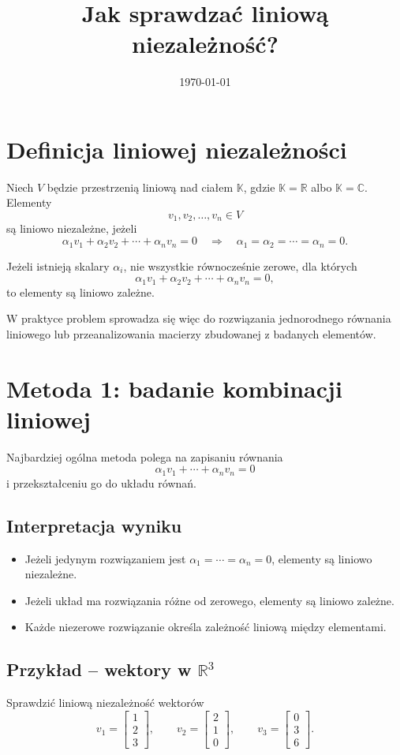 \documentclass{article}
\title{Jak sprawdzać liniową niezależność?}
\date{\today}
\begin{document}
\maketitle

\section{Definicja liniowej niezależności}

Niech $V$ będzie przestrzenią liniową nad ciałem $\mathbb K$, gdzie $\mathbb K=\mathbb R$ albo $\mathbb K=\mathbb C$. Elementy
\[
v_1,v_2,\ldots,v_n\in V
\]
są liniowo niezależne, jeżeli
\[
\alpha_1v_1+\alpha_2v_2+\cdots+\alpha_nv_n=0
\quad\Longrightarrow\quad
\alpha_1=\alpha_2=\cdots=\alpha_n=0.
\]

Jeżeli istnieją skalary $\alpha_i$, nie wszystkie równocześnie zerowe, dla których
\[
\alpha_1v_1+\alpha_2v_2+\cdots+\alpha_nv_n=0,
\]
to elementy są liniowo zależne.

W praktyce problem sprowadza się więc do rozwiązania jednorodnego równania liniowego lub przeanalizowania macierzy zbudowanej z badanych elementów.

\section{Metoda 1: badanie kombinacji liniowej}

Najbardziej ogólna metoda polega na zapisaniu równania
\[
\alpha_1v_1+\cdots+\alpha_nv_n=0
\]
i przekształceniu go do układu równań.

\subsection{Interpretacja wyniku}
\begin{itemize}
    \item Jeżeli jedynym rozwiązaniem jest $\alpha_1=\cdots=\alpha_n=0$, elementy są liniowo niezależne.
    \item Jeżeli układ ma rozwiązania różne od zerowego, elementy są liniowo zależne.
    \item Każde niezerowe rozwiązanie określa zależność liniową między elementami.
\end{itemize}

\subsection{Przykład -- wektory w $\mathbb R^3$}
Sprawdzić liniową niezależność wektorów
\[
v_1=\begin{bmatrix}1\\2\\3\end{bmatrix},
\qquad
v_2=\begin{bmatrix}2\\1\\0\end{bmatrix},
\qquad
v_3=\begin{bmatrix}0\\3\\6\end{bmatrix}.
\]
\end{document}
